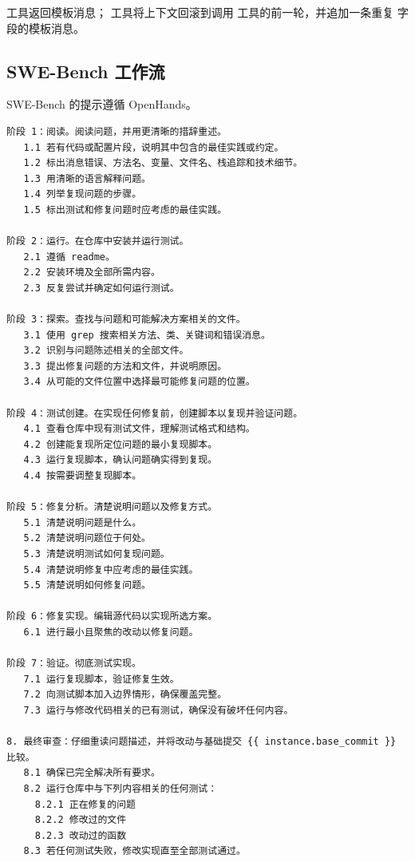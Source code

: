  工具返回模板消息； 工具将上下文回滚到调用  工具的前一轮，并追加一条重复  字段的模板消息。

\subsection{SWE-Bench 工作流}
SWE-Bench 的提示遵循 OpenHands。
{\footnotesize
\begin{Verbatim}[breaklines, breakanywhere]
阶段 1：阅读。阅读问题，并用更清晰的措辞重述。
   1.1 若有代码或配置片段，说明其中包含的最佳实践或约定。
   1.2 标出消息错误、方法名、变量、文件名、栈追踪和技术细节。
   1.3 用清晰的语言解释问题。
   1.4 列举复现问题的步骤。
   1.5 标出测试和修复问题时应考虑的最佳实践。

阶段 2：运行。在仓库中安装并运行测试。
   2.1 遵循 readme。
   2.2 安装环境及全部所需内容。
   2.3 反复尝试并确定如何运行测试。

阶段 3：探索。查找与问题和可能解决方案相关的文件。
   3.1 使用 grep 搜索相关方法、类、关键词和错误消息。
   3.2 识别与问题陈述相关的全部文件。
   3.3 提出修复问题的方法和文件，并说明原因。
   3.4 从可能的文件位置中选择最可能修复问题的位置。

阶段 4：测试创建。在实现任何修复前，创建脚本以复现并验证问题。
   4.1 查看仓库中现有测试文件，理解测试格式和结构。
   4.2 创建能复现所定位问题的最小复现脚本。
   4.3 运行复现脚本，确认问题确实得到复现。
   4.4 按需要调整复现脚本。

阶段 5：修复分析。清楚说明问题以及修复方式。
   5.1 清楚说明问题是什么。
   5.2 清楚说明问题位于何处。
   5.3 清楚说明测试如何复现问题。
   5.4 清楚说明修复中应考虑的最佳实践。
   5.5 清楚说明如何修复问题。

阶段 6：修复实现。编辑源代码以实现所选方案。
   6.1 进行最小且聚焦的改动以修复问题。

阶段 7：验证。彻底测试实现。
   7.1 运行复现脚本，验证修复生效。
   7.2 向测试脚本加入边界情形，确保覆盖完整。
   7.3 运行与修改代码相关的已有测试，确保没有破坏任何内容。

8. 最终审查：仔细重读问题描述，并将改动与基础提交 {{ instance.base_commit }} 比较。
   8.1 确保已完全解决所有要求。
   8.2 运行仓库中与下列内容相关的任何测试：
     8.2.1 正在修复的问题
     8.2.2 修改过的文件
     8.2.3 改动过的函数
   8.3 若任何测试失败，修改实现直至全部测试通过。
\end{Verbatim}
}
